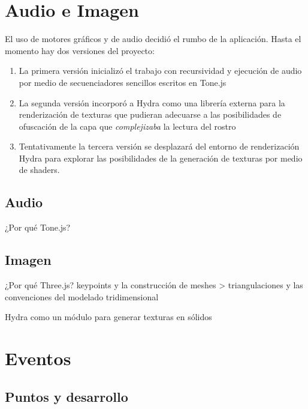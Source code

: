 \section{Audio e Imagen} %

El uso de motores gráficos y de audio decidió el rumbo de la aplicación. Hasta el momento hay dos versiones del proyecto:

\begin{enumerate}

\item La primera versión inicializó el trabajo con recursividad y ejecución de audio por medio de secuenciadores sencillos escritos en Tone.js
\item La segunda versión incorporó a Hydra como una librería externa para la renderización de texturas que pudieran adecuarse a las posibilidades de ofuscación de la capa que \emph{complejizaba} la lectura del rostro
\item Tentativamente la tercera versión se desplazará del entorno de renderización Hydra para explorar las posibilidades de la generación de texturas por medio de shaders.
  
\end{enumerate}

\subsection{Audio}

¿Por qué Tone.js? 

\subsection{Imagen}

¿Por qué Three.js?
keypoints y la construcción de meshes > triangulaciones y las convenciones del modelado tridimensional 

Hydra como un módulo para generar texturas en sólidos 


\section{Eventos}

\subsection{Puntos y desarrollo}

